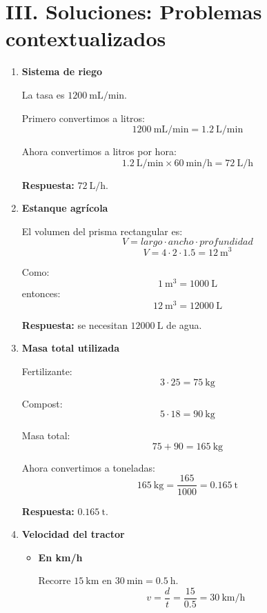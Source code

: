 \documentclass[12pt]{article}
\begin{document}
	\newpage
	
	\section*{III. Soluciones: Problemas contextualizados}
	
	\begin{enumerate}[itemsep=0.7cm]
		\item \textbf{Sistema de riego}
		
		La tasa es $1200\ \text{mL/min}$.
		
		Primero convertimos a litros:
		\[
		1200\ \text{mL/min}=1.2\ \text{L/min}
		\]
		
		Ahora convertimos a litros por hora:
		\[
		1.2\ \text{L/min}\times 60\ \text{min/h}=72\ \text{L/h}
		\]
		
		\textbf{Respuesta:} $72\ \text{L/h}$.
		
		\item \textbf{Estanque agrícola}
		
		El volumen del prisma rectangular es:
		\[
		V=largo \cdot ancho \cdot profundidad
		\]
		\[
		V=4\cdot2\cdot1.5=12\ \text{m}^3
		\]
		
		Como:
		\[
		1\ \text{m}^3=1000\ \text{L}
		\]
		entonces:
		\[
		12\ \text{m}^3=12000\ \text{L}
		\]
		
		\textbf{Respuesta:} se necesitan $12000\ \text{L}$ de agua.
		
		\item \textbf{Masa total utilizada}
		
		Fertilizante:
		\[
		3\cdot25=75\ \text{kg}
		\]
		
		Compost:
		\[
		5\cdot18=90\ \text{kg}
		\]
		
		Masa total:
		\[
		75+90=165\ \text{kg}
		\]
		
		Ahora convertimos a toneladas:
		\[
		165\ \text{kg}=\frac{165}{1000}=0.165\ \text{t}
		\]
		
		\textbf{Respuesta:} $0.165\ \text{t}$.
		
		\item \textbf{Velocidad del tractor}
		
		\begin{itemize}
			\item \textbf{En km/h}
			
			Recorre $15\ \text{km}$ en $30\ \text{min}=0.5\ \text{h}$.
			\[
			v=\frac{d}{t}=\frac{15}{0.5}=30\ \text{km/h}
			\]
			

\end{itemize}
\end{enumerate}
\end{document}
